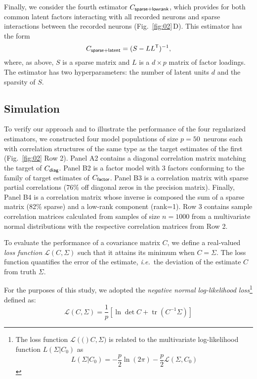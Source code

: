 \documentclass[10pt]{article}
\DeclareMathOperator{\Tr}{tr}
\newcommand{\loss}[1]{\mathcal L\left(#1\right)}
\newcommand{\T}{{\sf T}}
\begin{document}
Finally, we consider the fourth estimator $C_{\sf sparse+lowrank}$, which provides for both common latent factors interacting with all recorded neurons and sparse interactions between the recorded neurons (Fig.~\ref{fig:02}\,D). This estimator has the form
\begin{equation}
C_{\sf sparse+latent} = (S - LL^\T)^{-1},
\end{equation}
where, as above, $S$ is a sparse matrix and $L$ is a $d\times p$ matrix of factor loadings. The estimator has two hyperparameters: the number of latent units $d$ and the sparsity of $S$.

\subsection*{Simulation}
To verify our approach and to illustrate the performance of the four regularized estimators, we constructed four model populations of size $p=50$~neurons each with correlation structures of the same type as the target estimates of the first (Fig.~\ref{fig:02} Row 2). Panel A2 contains a diagonal correlation matrix matching the target of $C_{\sf diag}$. Panel B2 is a factor model with 3 factors conforming to the family of target estimates of $C_{\sf factor}$. Panel B3 is a correlation matrix with sparse partial correlations (76\% off diagonal zeros in the precision matrix). Finally, Panel B4 is a correlation matrix whose inverse is composed the sum of a sparse matrix (82\% sparse) and a low-rank component (rank=1).
Row 3 contains sample correlation matrices calculated from samples of size $n=1000$ from a multivariate normal distributions with the respective correlation matrices from Row 2.

To evaluate the performance of a covariance matrix $C$, we define a real-valued \emph{loss function} $\loss{C,\Sigma}$ such that it attains its minimum when $C=\Sigma$.  The loss function quantifies the error of the estimate, \emph{i.e.}~the deviation of the estimate $C$ from truth $\Sigma$.

For the purposes of this study, we adopted the \emph{negative normal log-likelihood loss}\footnote{
The loss function $\loss(C,\Sigma)$ is related to the multivariate log-likelihood function $L(\Sigma|C_0)$ as 
\begin{equation}
    L(\Sigma|C_0) = -\frac p 2 \ln(2\pi) -\frac p 2 \loss{\Sigma,C_0}
\end{equation}
}
defined as:
\begin{equation}\label{eq:loss}
    \loss{C,\Sigma} = \frac 1 p\left[\ln \det C + \Tr(C^{-1}\Sigma)\right]
\end{equation}
\end{document}
